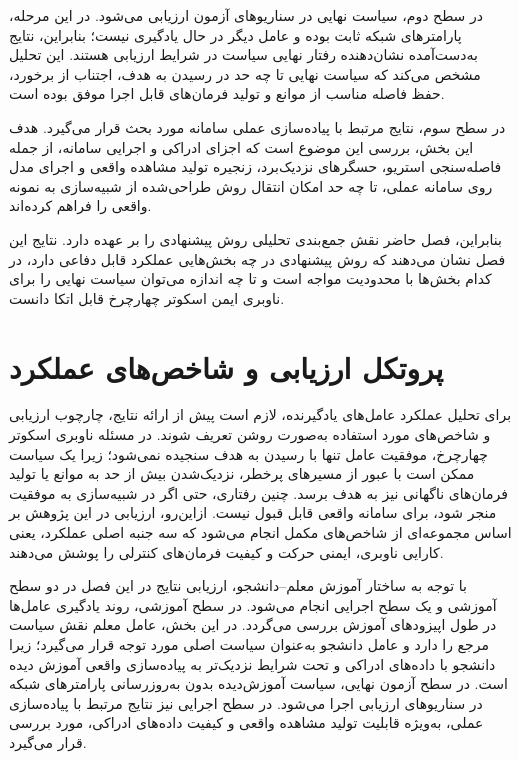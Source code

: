 در سطح دوم، سیاست نهایی در سناریوهای آزمون ارزیابی می‌شود. در این مرحله، پارامترهای شبکه ثابت بوده و عامل دیگر در حال یادگیری نیست؛ بنابراین، نتایج به‌دست‌آمده نشان‌دهنده رفتار نهایی سیاست در شرایط ارزیابی هستند. این تحلیل مشخص می‌کند که سیاست نهایی تا چه حد در رسیدن به هدف، اجتناب از برخورد، حفظ فاصله مناسب از موانع و تولید فرمان‌های قابل اجرا موفق بوده است.

در سطح سوم، نتایج مرتبط با پیاده‌سازی عملی سامانه مورد بحث قرار می‌گیرد. هدف این بخش، بررسی این موضوع است که اجزای ادراکی و اجرایی سامانه، از جمله فاصله‌سنجی استریو، حسگرهای نزدیک‌برد، زنجیره تولید مشاهده واقعی و اجرای مدل روی سامانه عملی، تا چه حد امکان انتقال روش طراحی‌شده از شبیه‌سازی به نمونه واقعی را فراهم کرده‌اند.

بنابراین، فصل حاضر نقش جمع‌بندی تحلیلی روش پیشنهادی را بر عهده دارد. نتایج این فصل نشان می‌دهند که روش پیشنهادی در چه بخش‌هایی عملکرد قابل دفاعی دارد، در کدام بخش‌ها با محدودیت مواجه است و تا چه اندازه می‌توان سیاست نهایی را برای ناوبری ایمن اسکوتر چهارچرخ قابل اتکا دانست.

\section{پروتکل ارزیابی و شاخص‌های عملکرد}
\label{sec:evaluation_protocol}

برای تحلیل عملکرد عامل‌های یادگیرنده، لازم است پیش از ارائه نتایج، چارچوب ارزیابی و شاخص‌های مورد استفاده به‌صورت روشن تعریف شوند. در مسئله ناوبری اسکوتر چهارچرخ، موفقیت عامل تنها با رسیدن به هدف سنجیده نمی‌شود؛ زیرا یک سیاست ممکن است با عبور از مسیرهای پرخطر، نزدیک‌شدن بیش از حد به موانع یا تولید فرمان‌های ناگهانی نیز به هدف برسد. چنین رفتاری، حتی اگر در شبیه‌سازی به موفقیت منجر شود، برای سامانه واقعی قابل قبول نیست. ازاین‌رو، ارزیابی در این پژوهش بر اساس مجموعه‌ای از شاخص‌های مکمل انجام می‌شود که سه جنبه اصلی عملکرد، یعنی کارایی ناوبری، ایمنی حرکت و کیفیت فرمان‌های کنترلی را پوشش می‌دهند.

با توجه به ساختار آموزش معلم--دانشجو، ارزیابی نتایج در این فصل در دو سطح آموزشی و یک سطح اجرایی انجام می‌شود. در سطح آموزشی، روند یادگیری عامل‌ها در طول اپیزودهای آموزش بررسی می‌گردد. در این بخش، عامل معلم نقش سیاست مرجع را دارد و عامل دانشجو به‌عنوان سیاست اصلی مورد توجه قرار می‌گیرد؛ زیرا دانشجو با داده‌های ادراکی و تحت شرایط نزدیک‌تر به پیاده‌سازی واقعی آموزش دیده است. در سطح آزمون نهایی، سیاست آموزش‌دیده بدون به‌روزرسانی پارامترهای شبکه در سناریوهای ارزیابی اجرا می‌شود. در سطح اجرایی نیز نتایج مرتبط با پیاده‌سازی عملی، به‌ویژه قابلیت تولید مشاهده واقعی و کیفیت داده‌های ادراکی، مورد بررسی قرار می‌گیرد.

